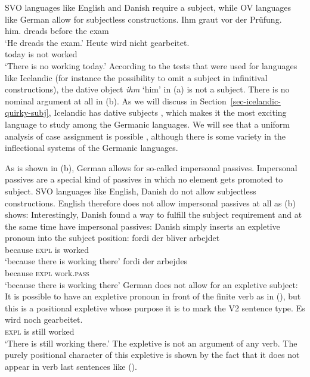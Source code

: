 SVO languages like English and Danish require a subject, while OV languages like German allow for
subjectless constructions.
\eal
\ex 
\gll Ihm graut vor der Prüfung.\\
     him.\DAT{} dreads before the exam\\\german
\glt `He dreads the exam.'
\ex 
\gll Heute wird nicht gearbeitet.\\
     today is   not worked\\
\glt `There is no working today.'
\zl
According to the tests that were used for languages like Icelandic (for instance the possibility to
omit a subject in infinitival constructions), the dative object \emph{ihm} `him' in (a) is
not a subject. There is no nominal argument at all in (b). As we will discuss in
Section~\ref{sec-icelandic-quirky-subj}, Icelandic has dative subjects \citep{ZMT85a}, which makes it the most
exciting language to study among the Germanic languages. We will see that a uniform analysis of case
assignment is possible \citep*{YMJ87}, although there is some variety in the inflectional systems of the Germanic languages.


As is shown in (b), German allows for so-called impersonal passives. Impersonal passives are
a special kind of passives in which no element gets promoted to subject. SVO languages like English,
Danish do not allow subjectless constructions. English therefore does not allow impersonal passives
at all as (b) shows:
\eal
{}
\zl
Interestingly, Danish found a way to fulfill the subject requirement and at the same time have
impersonal passives: Danish simply inserts an expletive pronoun into the subject position:
\eal
\label{ex-bliver-arbejder}
\ex 
\gll fordi der bliver arbejdet\\
     because \textsc{expl} is worked\\\danish
\glt `because there is working there'
\ex
\gll fordi   der arbejdes\\
     because  \textsc{expl} work.\textsc{pass}\\
\glt `because there is working there'
\zl
German does not allow for an expletive subject:
\z
It is possible to have an expletive pronoun in front of the finite verb as in (), but this is
a positional expletive whose purpose it is to mark the V2 sentence type. 
\ea
\gll  Es wird noch gearbeitet.\\
      \textsc{expl} is still worked\\\german
\glt `There is still working there.'
\z
The expletive is not an argument of any verb. The purely positional character of this expletive is shown by the fact that it does not
appear in verb last sentences like ().

